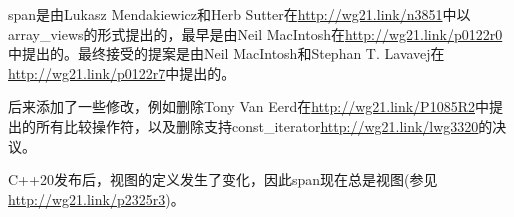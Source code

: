 span是由Lukasz Mendakiewicz和Herb Sutter在\url{http://wg21.link/n3851}中以array\_views的形式提出的，最早是由Neil MacIntosh在\url{http://wg21.link/p0122r0}中提出的。最终接受的提案是由Neil MacIntosh和Stephan T. Lavavej在\url{http://wg21.link/p0122r7}中提出的。

后来添加了一些修改，例如删除Tony Van Eerd在\url{http://wg21.link/P1085R2}中提出的所有比较操作符，以及删除支持const\_iterator\url{http://wg21.link/lwg3320}的决议。

C++20发布后，视图的定义发生了变化，因此span现在总是视图(参见\url{http://wg21.link/p2325r3})。